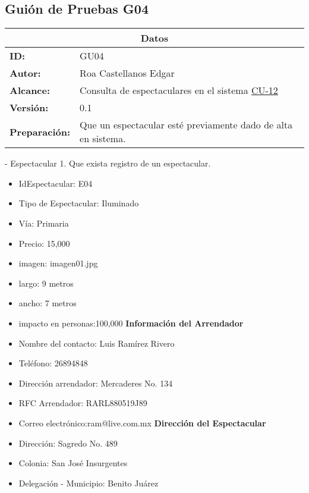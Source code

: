 \subsection{Guión de Pruebas G04}
\begin{table}[htbp]
\centering
\begin{tabular}{| p{5cm}| p{13cm} |} \hline
\multicolumn{2}{|c|}{\textbf{Datos}} \\ \hline
    \textbf{ID:}&GU04\\ \hline
    \textbf{Autor:}&Roa Castellanos Edgar\\ \hline
    \textbf{Alcance:}&Consulta de espectaculares en el sistema \hyperlink{CU:CU-12}{CU-12}\\ \hline
    \textbf{Versión:}&0.1\\ \hline
    \textbf{Preparación:}&Que un espectacular esté previamente dado de alta en sistema.\\ \hline
    \end{tabular}
\end{table}
- Espectacular 1. Que exista registro de un espectacular. 
\begin{itemize}
    \item IdEspectacular: E04
    \item Tipo de Espectacular: Iluminado
    \item Vía: Primaria
    \item Precio: 15,000
    \item imagen: imagen01.jpg
    \item largo: 9 metros
    \item ancho: 7 metros
    \item impacto en personas:100,000
    \textbf{Información del Arrendador}
    \item Nombre del contacto: Luis Ramírez Rivero
    \item Teléfono: 26894848
    \item Dirección arrendador: Mercaderes No. 134
    \item RFC Arrendador: RARL880519J89
    \item Correo electrónico:ram@live.com.mx
    \textbf{Dirección del Espectacular}
    \item Dirección: Sagredo No. 489
    \item Colonia: San José Insurgentes
    \item Delegación - Municipio: Benito Juárez\\
\end{itemize}


